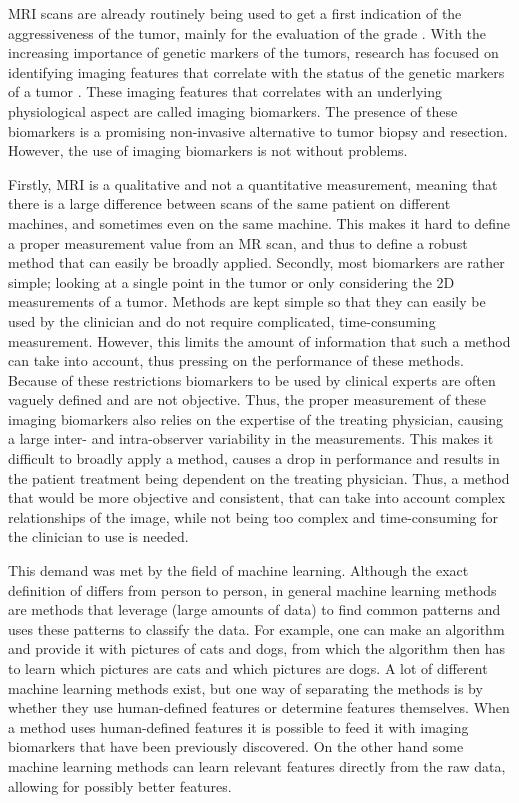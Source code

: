 \gls{MRI} scans are already routinely being used to get a first indication of the aggressiveness of the tumor, mainly for the evaluation of the grade \autocite{upadhyay2011MRIevaluation}.
With the increasing importance of genetic markers of the tumors, research has focused on identifying imaging features that correlate with the status of the genetic markers of a tumor \autocite{patel2017mismatch, smits2016imaging}.
These imaging features that correlates with an underlying physiological aspect are called imaging biomarkers.
The presence of these biomarkers is a promising non-invasive alternative to tumor biopsy and resection.
However, the use of imaging biomarkers is not without problems.

Firstly, \gls{MRI} is a qualitative and not a quantitative measurement, meaning that there is a large difference between scans of the same patient on different machines, and sometimes even on the same machine.
This makes it hard to define a proper measurement value from an \gls{MR} scan, and thus to define a robust method that can easily be broadly applied.
Secondly, most biomarkers are rather simple; looking at a single point in the tumor or only considering the 2D measurements of a tumor.
Methods are kept simple so that they can easily be used by the clinician and do not require complicated, time-consuming measurement.
However, this limits the amount of information that such a method can take into account, thus pressing on the performance of these methods.
Because of these restrictions biomarkers to be used by clinical experts are often vaguely defined and are not objective.
Thus, the proper measurement of these imaging biomarkers also relies on the expertise of the treating physician, causing a large inter- and intra-observer variability in the measurements.
This makes it difficult to broadly apply a method, causes a drop in performance and results in the patient treatment being dependent on the treating physician.
Thus, a method that would be more objective and consistent, that can take into account complex relationships of the image, while not being too complex and time-consuming for the clinician to use is needed.

This demand was met by the field of machine learning.
Although the exact definition of  differs from person to person, in general machine learning methods are methods that leverage (large amounts of data) to find common patterns and uses these patterns to classify the data.
For example, one can make an algorithm and provide it with pictures of cats and dogs, from which the algorithm then has to learn which pictures are cats and which pictures are dogs.
A lot of different machine learning methods exist, but one way of separating the methods is by whether they use human-defined features or determine features themselves.
When a method uses human-defined features it is possible to feed it with imaging biomarkers that have been previously discovered.
On the other hand some machine learning methods can learn relevant features directly from the raw data, allowing for possibly better features.

